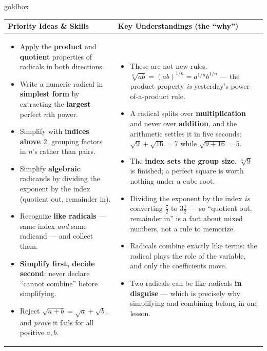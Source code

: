 \documentclass[10pt]{article}
\begin{document}
\renewcommand{\arraystretch}{1.4}
\begin{skillbox}{goldbox}
\begin{tabularx}{\linewidth}{@{}X|X@{}}
\textbf{Priority Ideas \& Skills} & \textbf{Key Understandings (the ``why'')} \\[2pt]
\hline
\vspace{-6pt}
\begin{itemize}[leftmargin=1.1em, nosep, after=\vspace{2pt}]
  \item Apply the \textbf{product} and \textbf{quotient} properties of radicals in both directions.
  \item Write a numeric radical in \textbf{simplest form} by extracting the \textbf{largest} perfect $n$th power.
  \item Simplify with \textbf{indices above $2$}, grouping factors in $n$'s rather than pairs.
  \item Simplify \textbf{algebraic} radicands by dividing the exponent by the index (quotient out, remainder in).
  \item Recognize \textbf{like radicals} --- same index \emph{and} same radicand --- and collect them.
  \item \textbf{Simplify first, decide second}: never declare ``cannot combine'' before simplifying.
  \item Reject $\sqrt{a+b}=\sqrt a+\sqrt b$, and \emph{prove} it fails for all positive $a,b$.
\end{itemize}
&
\vspace{-6pt}
\begin{itemize}[leftmargin=1.1em, nosep, after=\vspace{2pt}]
  \item These are not new rules. $\sqrt[n]{ab}=(ab)^{1/n}=a^{1/n}b^{1/n}$ --- the product property \emph{is} yesterday's power-of-a-product rule.
  \item A radical splits over \textbf{multiplication} and never over \textbf{addition}, and the arithmetic settles it in five seconds: $\sqrt9+\sqrt{16}=7$ while $\sqrt{9+16}=5$.
  \item The \textbf{index sets the group size}. $\sqrt[3]{9}$ is finished; a perfect square is worth nothing under a cube root.
  \item Dividing the exponent by the index \emph{is} converting $\frac{7}{2}$ to $3\frac12$ --- so ``quotient out, remainder in'' is a fact about mixed numbers, not a rule to memorize.
  \item Radicals combine exactly like terms: the radical plays the role of the variable, and only the coefficients move.
  \item Two radicals can be like radicals \textbf{in disguise} --- which is precisely why simplifying and combining belong in one lesson.
\end{itemize}
\end{tabularx}
\end{skillbox}
\end{document}

